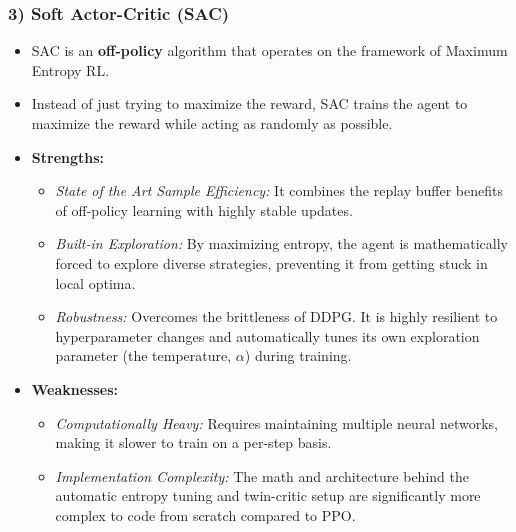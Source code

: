 \documentclass[12pt]{article}
\begin{document}
\subsubsection*{3) Soft Actor-Critic (SAC)}
\begin{itemize}[label=$\bullet$]
    \item SAC is an \textbf{off-policy} algorithm that operates on the framework of Maximum Entropy RL.
    \item Instead of just trying to maximize the reward, SAC trains the agent to maximize the reward while acting as randomly as possible.
    \item \textbf{Strengths:}
    \begin{itemize}[label=$\circ$]
        \item \textit{State of the Art Sample Efficiency:} It combines the replay buffer benefits of off-policy learning with highly stable updates.
        \item \textit{Built-in Exploration:} By maximizing entropy, the agent is mathematically forced to explore diverse strategies, preventing it from getting stuck in local optima.
        \item \textit{Robustness:} Overcomes the brittleness of DDPG. It is highly resilient to hyperparameter changes and automatically tunes its own exploration parameter (the temperature, $\alpha$) during training.
    \end{itemize}
    \item \textbf{Weaknesses:}
    \begin{itemize}[label=$\circ$]
        \item \textit{Computationally Heavy:} Requires maintaining multiple neural networks, making it slower to train on a per-step basis.
        \item \textit{Implementation Complexity:} The math and architecture behind the automatic entropy tuning and twin-critic setup are significantly more complex to code from scratch compared to PPO.
    \end{itemize}
\end{itemize}
\end{document}
